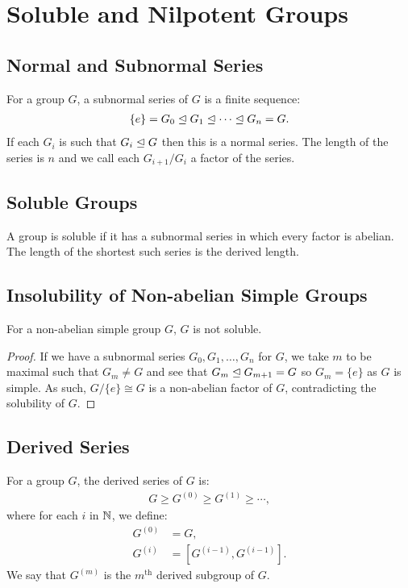 \section{Soluble and Nilpotent Groups}

\subsection{Normal and Subnormal Series}

For a group $G$, a subnormal series of $G$ is a finite sequence:
\begin{align*}
    \{e\} = G_0 \trianglelefteq G_1 \trianglelefteq \cdots \trianglelefteq G_n = G.
\end{align*} If each $G_i$ is such that $G_i \trianglelefteq G$ then this is a
normal series. The length of the series is $n$ and we call
each $G_{i + 1} / G_i$ a factor of the series.

\subsection{Soluble Groups}

A group is soluble if it has a subnormal series in which every
factor is abelian. The length of the shortest such series is the
derived length.

\subsection{Insolubility of Non-abelian Simple Groups} \label{8.1}

For a non-abelian simple group $G$, $G$ is not soluble.

\begin{proof}
    If we have a subnormal series $G_0, G_1, \ldots, G_n$ for $G$,
    we take $m$ to be maximal such that $G_m \neq G$ and see that
    $G_m \trianglelefteq G_{m + 1} = G$ so $G_m = \{e\}$ as $G$ is simple.
    As such, $G / \{e\} \cong G$ is a non-abelian factor of $G$,
    contradicting the solubility of $G$.
\end{proof}

\subsection{Derived Series}

For a group $G$, the derived series of $G$ is: \begin{align*}
    G \geq G^{(0)} \geq G^{(1)} \geq \cdots,
\end{align*} where for each $i$ in $\mathbb{N}$, we define:
\begin{align*}
    G^{(0)} &= G, \\
    G^{(i)} &= [G^{(i - 1)}, G^{(i - 1)}].
\end{align*} We say that $G^{(m)}$ is the $m^{\text{th}}$ derived
subgroup of $G$.

